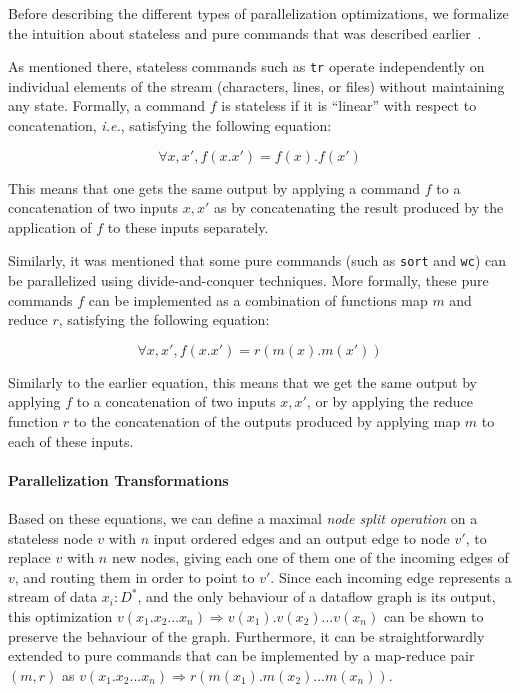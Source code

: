 \documentclass[acmsmall,10pt,review,anonymous]{acmart}
\newcommand{\ie}{{\em i.e.}, }
\newcommand{\ttt}[1]{\texttt{\small #1}}
\newcommand{\nv}[1]{[{\color{cyan}#1 --- nv}]}
\begin{document}
Before describing the different types of parallelization
optimizations, we formalize the intuition about stateless and pure
commands that was described earlier~.
%

As mentioned there, stateless commands such as \ttt{tr} operate independently on
individual elements of the stream (characters, lines, or files)
without maintaining any state.
Formally, a command $f$ is stateless if
it is ``linear'' with respect to concatenation, \ie 
satisfying the following equation:

\[
\forall x, x', f(x.x') = f(x).f(x')
\]


\noindent
This means that one gets the same output by applying a command $f$ to a
concatenation of two inputs $x, x'$ as by concatenating the result
produced by the application of $f$ to these inputs
separately.

Similarly, it was mentioned that some pure commands (such
as \ttt{sort} and \ttt{wc}) can be parallelized using
divide-and-conquer techniques. More formally, these pure commands $f$
can be implemented as a combination of functions map $m$ and reduce $r$, satisfying
the following equation:

\[
\forall x, x', f(x.x') = r(m(x).m(x'))
\]

\noindent
Similarly to the earlier equation, this means that we get the same output by
applying $f$ to a concatenation of two inputs $x, x'$, or by applying
the reduce function $r$ to the concatenation of the outputs produced
by applying map $m$ to each of these inputs.

\paragraph{Parallelization Transformations}
%
Based on these equations, we can define a maximal \emph{node split
  operation} on a stateless node $v$ with $n$ input ordered edges and
an output edge to node $v'$, to replace $v$ with $n$ new nodes, giving
each one of them one of the incoming edges of $v$, and routing them in
order to point to $v'$. Since each incoming edge represents a stream
of data $x_i : D^*$, and the only behaviour of a dataflow graph is its
output, this optimization $ v(x_1.x_2...x_n) \Rightarrow
v(x_1).v(x_2)...v(x_n)$ can be shown to preserve the behaviour of the
graph. Furthermore, it can be straightforwardly extended to pure
commands that can be implemented by a map-reduce pair $(m, r)$ as $
v(x_1.x_2...x_n) \Rightarrow r(m(x_1).m(x_2)...m(x_n))$.
\end{document}
